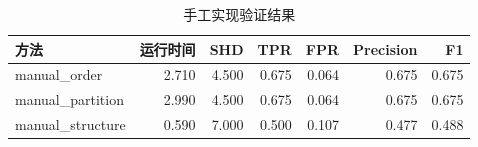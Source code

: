 \begin{table}[H]
\centering
\small
\setlength{\tabcolsep}{2pt}
\caption{手工实现验证结果}
\label{tab:manual}
\begin{tabular}{lrrrrrr}
\toprule
方法 & 运行时间 & SHD & TPR & FPR & Precision & F1
\\
\midrule
manual\_order & 2.710 & 4.500 & 0.675 & 0.064 & 0.675 & 0.675 \\
manual\_partition & 2.990 & 4.500 & 0.675 & 0.064 & 0.675 & 0.675 \\
manual\_structure & 0.590 & 7.000 & 0.500 & 0.107 & 0.477 & 0.488 \\
\bottomrule
\end{tabular}
\end{table}
